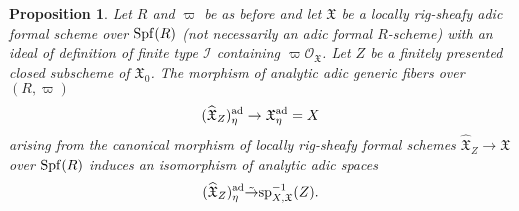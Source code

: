 \documentclass[12pt,twoside,a4paper]{article}
\newtheorem{prop}[thm]{Proposition}
\theoremstyle{definition}
\theoremstyle{remark}
\newcommand\ad{{\rm ad}}
\newcommand\spc{{\rm sp}}
\newcommand\Spf{{\rm Spf}}
\begin{document}
\begin{prop}\label{Berthelot's proposition}Let $R$ and $\varpi$ be as before and let $\mathfrak{X}$ be a locally rig-sheafy adic formal scheme over $\Spf(R)$ (not necessarily an adic formal $R$-scheme) with an ideal of definition of finite type $\mathcal{I}$ containing $\varpi\mathcal{O}_{\mathfrak{X}}$. Let $Z$ be a finitely presented closed subscheme of $\mathfrak{X}_{0}$. The morphism of analytic adic generic fibers over $(R, \varpi)$ \begin{equation*}(\widehat{\mathfrak{X}}_{Z})_{\eta}^{\ad}\to \mathfrak{X}_{\eta}^{\ad}=X\end{equation*}arising from the canonical morphism of locally rig-sheafy formal schemes $\widehat{\mathfrak{X}}_{Z}\to\mathfrak{X}$ over $\Spf(R)$ induces an isomorphism of analytic adic spaces \begin{equation*}(\widehat{\mathfrak{X}}_{Z})_{\eta}^{\ad}\tilde{\rightarrow} \spc_{X,\mathfrak{X}}^{-1}(Z).\end{equation*}\end{prop}
\end{document}
